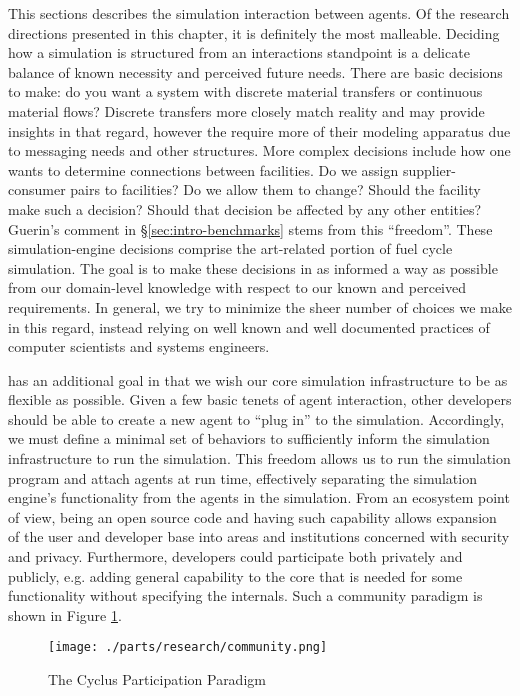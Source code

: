 This sections describes the simulation interaction between agents. Of the
research directions presented in this chapter, it is definitely the most
malleable. Deciding how a simulation is structured from an interactions
standpoint is a delicate balance of known necessity and perceived future
needs. There are basic decisions to make: do you want a system with discrete
material transfers or continuous material flows? Discrete transfers more closely
match reality and may provide insights in that regard, however the require more
of their modeling apparatus due to messaging needs and other structures. More
complex decisions include how one wants to determine connections between
facilities. Do we assign supplier-consumer pairs to facilities? Do we allow them
to change? Should the facility make such a decision? Should that decision be
affected by any other entities? Guerin's comment in \S\ref{sec:intro-benchmarks}
stems from this ``freedom''. These simulation-engine decisions comprise the
art-related portion of fuel cycle simulation. The goal is to make these
decisions in as informed a way as possible from our domain-level knowledge with
respect to our known and perceived requirements. In general, we try to minimize
the sheer number of choices we make in this regard, instead relying on well
known and well documented practices of computer scientists and systems
engineers.

\Cyclus has an additional goal in that we wish our core simulation
infrastructure to be as flexible as possible. Given a few basic tenets of agent
interaction, other developers should be able to create a new agent to ``plug
in'' to the simulation. Accordingly, we must define a minimal set of behaviors
to sufficiently inform the simulation infrastructure to run the simulation. This
freedom allows us to run the simulation program and attach agents at run time,
effectively separating the simulation engine's functionality from the agents in
the simulation. From an ecosystem point of view, being an open source code and
having such capability allows expansion of the user and developer base into
areas and institutions concerned with security and privacy. Furthermore,
developers could participate both privately and publicly, e.g. adding general
capability to the \Cyclus core that is needed for some functionality without
specifying the internals. Such a community paradigm is shown in Figure
\ref{fig:community}.

\begin{figure}[htbp!]
  \begin{center}
    \texttt{[image: ./parts/research/community.png]}
  \end{center}
  \caption{The Cyclus Participation Paradigm} 
  \label{fig:community}
\end{figure}

